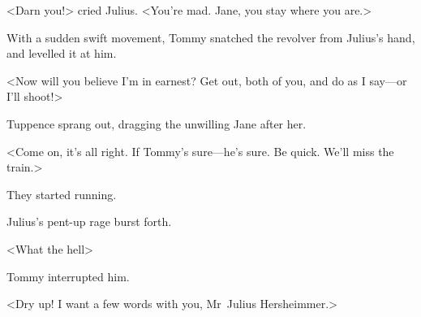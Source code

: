 <Darn you!> cried Julius. <You're mad. Jane, you stay where you are.>

With a sudden swift movement, Tommy snatched the revolver from Julius's hand, and levelled it at him.

<Now will you believe I'm in earnest? Get out, both of you, and do as I say—or I'll shoot!>

Tuppence sprang out, dragging the unwilling Jane after her.

<Come on, it's all right. If Tommy's sure—he's sure. Be quick. We'll miss the train.>

They started running.

Julius's pent-up rage burst forth.

<What the hell\longdash>

Tommy interrupted him.

<Dry up! I want a few words with you, Mr~Julius Hersheimmer.> 